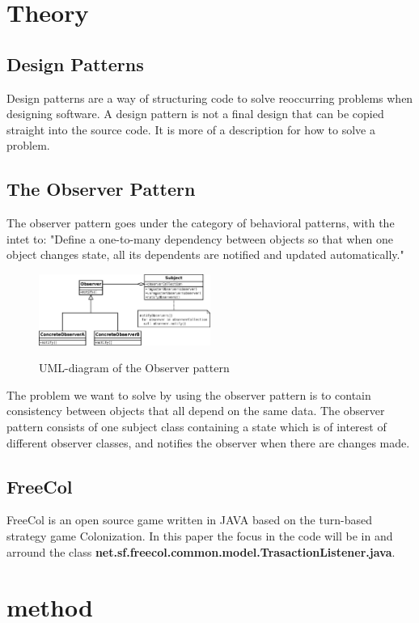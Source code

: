 \documentclass[journal]{IEEEtran}
\begin{document}
\section{Theory}
\subsection{Design Patterns}
Design patterns are a way of structuring code to solve reoccurring problems when designing software. A design pattern is not a final design that can be copied straight into the source code. It is more of a description for how to solve a problem. \cite{Usefulnessofdesign}

\subsection{The Observer Pattern}
The observer pattern goes under the category of behavioral patterns, with the intet to: "Define a one-to-many dependency between objects so that when one object changes state, all its dependents are notified and updated automatically." \cite{gof}
\begin{figure}[h]
\includegraphics[width=0.5\textwidth]{Observer.png}
\label{obeserver}
\caption{UML-diagram of the Observer pattern \cite{observerpng}}
\end{figure}

The problem we want to solve by using the observer pattern is to contain consistency between objects that all depend on the same data. The observer pattern consists of one subject class containing a state which is of interest of different observer classes, and notifies the observer when there are changes made.

\subsection{FreeCol}
FreeCol is an open source game written in JAVA based on the turn-based strategy game Colonization\cite{freecol}. In this paper the focus in the code will be in and arround the class \textbf{net.sf.freecol.common.model.TrasactionListener.java}.

\section{method}
\end{document}
